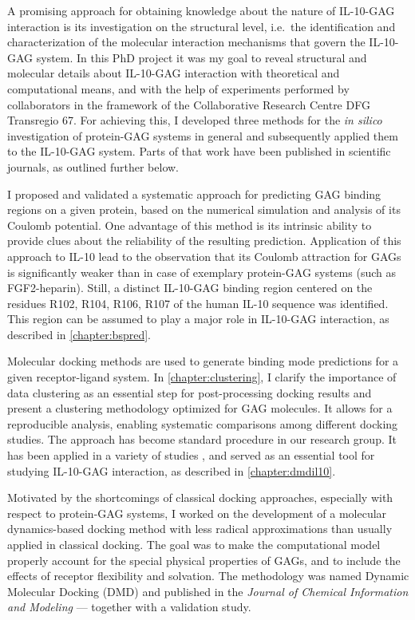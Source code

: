 A promising approach for obtaining knowledge about the nature of IL-10-GAG
interaction is its investigation on the structural level, i.e.\ the
identification and characterization of the molecular interaction mechanisms that
govern the IL-10-GAG system. In this PhD project it was my goal to reveal
structural and molecular details about IL-10-GAG interaction with theoretical
and computational means, and with the help of experiments performed by
collaborators in the framework of the Collaborative Research Centre DFG
Transregio 67. For achieving this, I developed three methods for the
\textit{in silico} investigation of protein-GAG systems in general and
subsequently applied them to the IL-10-GAG system. Parts of that work have been
published in scientific journals, as outlined further below.

I proposed and validated a systematic approach for predicting GAG binding
regions on a given protein, based on the numerical simulation and analysis of
its Coulomb potential. One advantage of this method is its intrinsic ability to
provide clues about the reliability of the resulting prediction. Application of
this approach to IL-10 lead to the observation that its Coulomb attraction for
GAGs is significantly weaker than in case of exemplary protein-GAG systems (such
as FGF2-heparin). Still, a distinct IL-10-GAG binding region centered on the
residues R102, R104, R106, R107 of the human IL-10 sequence was identified. This
region can be assumed to play a major role in IL-10-GAG interaction, as
described in \cref{chapter:bspred}.

Molecular docking methods are used to generate binding mode predictions for a
given receptor-ligand system. In \cref{chapter:clustering}, I clarify the
importance of data clustering as an essential step for post-processing docking
results and present a clustering methodology optimized for GAG molecules. It
allows for a reproducible analysis, enabling systematic comparisons among
different docking studies. The approach has become standard procedure in our
research group. It has been applied in a variety of studies
\cite{franz_cathepsin_2013, hintze_sergey_2014, Samsonov_rings_cr_2013,
SalbachHirsch20137653, vanderSmissen2013}, and served as an essential tool for
studying IL-10-GAG interaction, as described in \cref{chapter:dmdil10}.

Motivated by the shortcomings of classical docking approaches, especially with
respect to protein-GAG systems, I worked on the development of a molecular
dynamics-based docking method with less radical approximations than usually
applied in classical docking. The goal was to make the computational model
properly account for the special physical properties of GAGs, and to include the
effects of receptor flexibility and solvation. The methodology was named Dynamic
Molecular Docking (DMD) and published in the \textit{Journal of Chemical
Information and Modeling} \cite{dmd_samsonov_gehrcke_2014} --- together with a
validation study.

